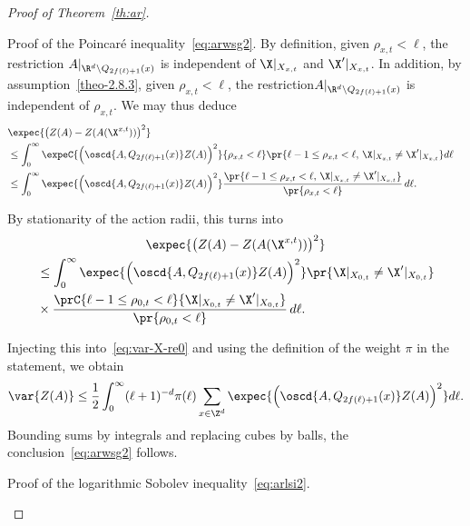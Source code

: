 \begin{proof}[Proof of Theorem~\ref{th:ar}]
\begin{step}{Proof of the Poincaré inequality~\eqref{eq:arwsg2}.}
By definition, given $\rho_{x,t}<\ell$, the restriction $A|_{\R^d\setminus Q_{2f(\ell)+1}(x)}$ is independent of $\X|_{X_{x,t}}$ and $\X'|_{X_{x,t}}$. In addition, by assumption~\eqref{theo-2.8.3}, given $\rho_{x,t}<\ell$, the restriction\linebreak$A|_{\R^d\setminus Q_{2f(\ell)+1}(x)}$ is independent of $\rho_{x,t}$. We may thus deduce
\begin{align*}
\lefteqn{\expec{\big(Z(A)-Z(A(\X^{x,t}))\big)^2}}\\
&\le\int_0^\infty \expeC{\Big(\oscd{A,Q_{2f(\ell)+1}(x)}Z(A)\Big)^2}{\rho_{x,t}<\ell}\pr{\ell-1\le\rho_{x,t}<\ell,\,\X|_{X_{x,t}}\ne \X'|_{X_{x,t}}}d\ell\\
&\le\int_0^\infty \expec{\Big(\oscd{A,Q_{2f(\ell)+1}(x)}Z(A)\Big)^2}\frac{\pr{\ell-1\le\rho_{x,t}<\ell,\,\X|_{X_{x,t}}\ne \X'|_{X_{x,t}}}}{\pr{\rho_{x,t}<\ell}}\,d\ell.
\end{align*}



By stationarity of the action radii, this turns into
\begin{multline}\label{eq:step2-ar-1}
\expec{\big(Z(A)-Z(A(\X^{x,t}))\big)^2}\\
\begin{aligned}
&\le\int_0^\infty\expec{\Big(\oscd{A,Q_{2f(\ell)+1}(x)}Z(A)\Big)^2}\pr{\X|_{X_{0,t}}\ne \X'|_{X_{0,t}}}\\
&\times \frac{\prC{\ell-1\le \rho_{0,t}< \ell}{\X|_{X_{0,t}}\ne \X'|_{X_{0,t}}}}{\pr{\rho_{0,t}< \ell}}\,d\ell.
\end{aligned}
\end{multline}



Injecting this into~\eqref{eq:var-X-re0} and using the definition of the weight $\pi$ in the statement, we obtain
\[
\var{Z(A)}\le\frac12\int_0^\infty(\ell+1)^{-d}\pi(\ell)\sum_{x\in\Z^d}\expec{\Big(\oscd{A,Q_{2f(\ell)+1}(x)}Z(A)\Big)^2}d\ell.
\]
Bounding sums by integrals and replacing cubes by balls, the conclusion~\eqref{eq:arwsg2} follows.
\end{step}


\begin{step}{Proof of the logarithmic Sobolev inequality~\eqref{eq:arlsi2}.}\label{step2prooftheo2.6}


\end{step}
\end{proof}
